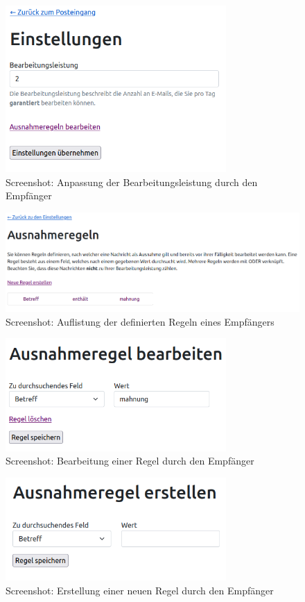 \begin{figure}[!h]
	\centering
		\includegraphics[width=0.75\textwidth]{Figures/recipients.png}
	\caption{Screenshot: Anpassung der Bearbeitungsleistung durch den Empfänger}
	\label{fig:screenshot_recipients}
\end{figure}

\begin{figure}[!h]
	\centering
		\includegraphics[width=1.1\textwidth]{Figures/rules1.png}
	\caption{Screenshot: Auflistung der definierten Regeln eines Empfängers}
	\label{fig:screenshot_rules1}
\end{figure}

\begin{figure}[!h]
	\centering
		\includegraphics[width=0.75\textwidth]{Figures/rules2.png}
	\caption{Screenshot: Bearbeitung einer Regel durch den Empfänger}
	\label{fig:screenshot_rules2}
\end{figure}

\begin{figure}[!h]
	\centering
		\includegraphics[width=0.75\textwidth]{Figures/rules3.png}
	\caption{Screenshot: Erstellung einer neuen Regel durch den Empfänger}
	\label{fig:screenshot_rules3}
\end{figure}

